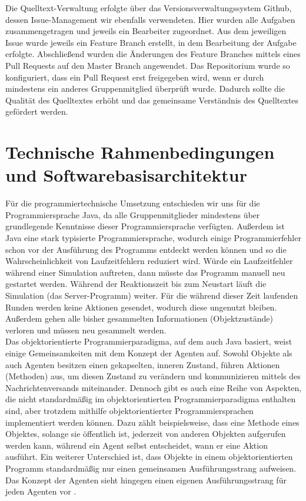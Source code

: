 \documentclass[runningheads]{llncs}
\begin{document}
Die Quelltext-Verwaltung erfolgte über das Versionsverwaltungssystem Github, dessen Issue-Management wir ebenfalls verwendeten. Hier wurden alle Aufgaben zusammengetragen und jeweils ein Bearbeiter zugeordnet. Aus dem jeweiligen Issue wurde jeweils ein Feature Branch erstellt, in dem Bearbeitung der Aufgabe erfolgte. Abschließend wurden die Änderungen des Feature Branches mittels eines Pull Requests auf den Master Branch angewendet. Das Repositorium wurde so konfiguriert, dass ein Pull Request erst freigegeben wird, wenn er durch mindestens ein anderes Gruppenmitglied überprüft wurde. Dadurch sollte die Qualität des Quelltextes erhöht und das gemeinsame Verständnis des Quelltextes gefördert werden.

\section{Technische Rahmenbedingungen und Softwarebasisarchitektur}
Für die programmiertechnische Umsetzung entschieden wir uns für die Programmiersprache Java, da alle Gruppenmitglieder mindestens über grundlegende Kenntnisse dieser Programmiersprache verfügten. Außerdem ist Java eine stark typisierte Programmiersprache, wodurch einige Programmierfehler schon vor der Ausführung des Programms entdeckt werden können und so die Wahrscheinlichkeit von Laufzeitfehlern reduziert wird. Würde ein Laufzeitfehler während einer Simulation auftreten, dann müsste das Programm manuell neu gestartet werden. Während der Reaktionszeit bis zum Neustart läuft die Simulation (das Server-Programm) weiter. Für die während dieser Zeit laufenden Runden werden keine Aktionen gesendet, wodurch diese ungenutzt bleiben. Außerdem gehen alle bisher gesammelten Informationen (Objektzustände) verloren und müssen neu gesammelt werden.\\

Das objektorientierte Programmierparadigma, auf dem auch Java basiert, weist einige Gemeinsamkeiten mit dem Konzept der Agenten auf. Sowohl Objekte als auch Agenten besitzen einen gekapselten, inneren Zustand, führen Aktionen (Methoden) aus, um diesen Zustand zu verändern und kommunizieren mittels des Nachrichtenversands miteinander. Dennoch gibt es auch eine Reihe von Aspekten, die nicht standardmäßig im objektorientierten Programmierparadigma enthalten sind, aber trotzdem mithilfe objektorientierter Programmiersprachen implementiert werden können. Dazu zählt beispielsweise, dass eine Methode eines Objektes, solange sie öffentlich ist, jederzeit von anderen Objekten aufgerufen werden kann, während ein Agent selbst entscheidet, wann er eine Aktion ausführt. Ein weiterer Unterschied ist, dass Objekte in einem objektorientierten Programm standardmäßig nur einen gemeinsamen Ausführungsstrang aufweisen. Das Konzept der Agenten sieht hingegen einen eigenen Ausführungsstrang für jeden Agenten vor \cite{Weiss2000}.\\
\end{document}
